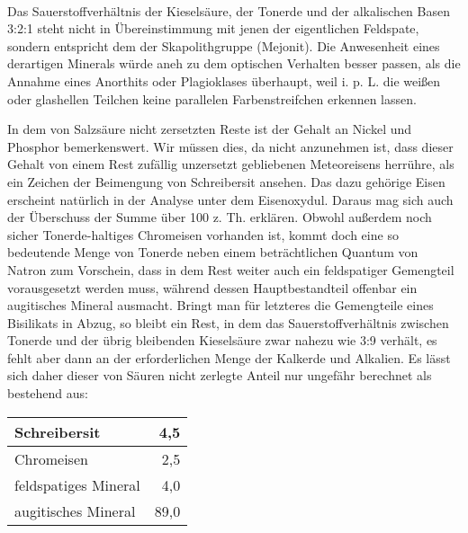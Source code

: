 \documentclass[a4paper, 11pt, oneside]{article}
\begin{document}
\paragraph{}
Das Sauerstoffverhältnis der Kieselsäure, der Tonerde und der alkalischen Basen 3:2:1 steht nicht in Übereinstimmung mit jenen der eigentlichen Feldspate, sondern entspricht dem der Skapolithgruppe (Mejonit). Die Anwesenheit eines derartigen Minerals würde aneh zu dem optischen Verhalten besser passen, als die Annahme eines Anorthits oder Plagioklases überhaupt, weil i. p. L. die weißen oder glashellen Teilchen keine parallelen Farbenstreifchen erkennen lassen.

In dem von Salzsäure nicht zersetzten Reste ist der Gehalt an Nickel und Phosphor bemerkenswert. Wir müssen dies, da nicht anzunehmen ist, dass dieser Gehalt von einem Rest zufällig unzersetzt gebliebenen Meteoreisens herrühre, als ein Zeichen der Beimengung von Schreibersit ansehen. Das dazu gehörige Eisen erscheint natürlich in der Analyse unter dem Eisenoxydul. Daraus mag sich auch der Überschuss der Summe über 100 z. Th. erklären. Obwohl außerdem noch sicher Tonerde-haltiges Chromeisen vorhanden ist, kommt doch eine so bedeutende Menge von Tonerde neben einem beträchtlichen Quantum von Natron zum Vorschein, dass in dem Rest weiter auch ein feldspatiger Gemengteil vorausgesetzt werden muss, während dessen Hauptbestandteil offenbar ein augitisches Mineral ausmacht. Bringt man für letzteres die Gemengteile eines Bisilikats in Abzug, so bleibt ein Rest, in dem das Sauerstoffverhältnis zwischen Tonerde und der übrig bleibenden Kieselsäure zwar nahezu wie 3:9 verhält, es fehlt aber dann an der erforderlichen Menge der Kalkerde und Alkalien. Es lässt sich daher dieser von Säuren nicht zerlegte Anteil nur ungefähr berechnet als bestehend aus:
\begin{center}
    \begin{tabular}{ |l|r| } 
    \hline
    Schreibersit & 4,5\\\hline
    Chromeisen & 2,5\\\hline
    feldspatiges Mineral & 4,0\\\hline
    augitisches Mineral & 89,0\\
    \hline
    \end{tabular}
\end{center}
\end{document}
